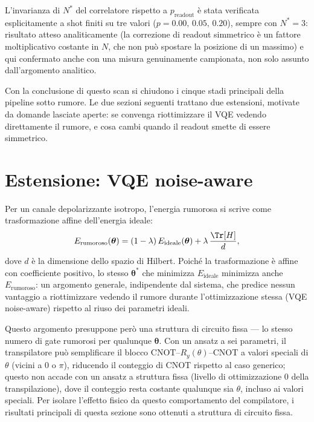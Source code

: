 \documentclass[11pt,a4paper]{article}
\begin{document}
L'invarianza di $N^*$ del correlatore rispetto a $p_\text{readout}$ è
stata verificata esplicitamente a shot finiti su tre valori
($p=0.00,\,0.05,\,0.20$), sempre con $N^*=3$: risultato atteso
analiticamente (la correzione di readout simmetrico è un fattore
moltiplicativo costante in $N$, che non può spostare la posizione di un
massimo) e qui confermato anche con una misura genuinamente campionata,
non solo assunto dall'argomento analitico.

Con la conclusione di questo scan si chiudono i cinque stadi principali
della pipeline sotto rumore. Le due sezioni seguenti trattano due
estensioni, motivate da domande lasciate aperte: se convenga
riottimizzare il VQE vedendo direttamente il rumore, e cosa cambi quando
il readout smette di essere simmetrico.

\section{Estensione: VQE noise-aware}
\label{sec:noise-aware}

Per un canale depolarizzante isotropo, l'energia rumorosa si scrive come
trasformazione affine dell'energia ideale:
\begin{equation}
E_\text{rumoroso}(\boldsymbol\theta) = (1-\lambda)\,E_\text{ideale}(\boldsymbol\theta)
+ \lambda\,\frac{\Tr[H]}{d},
\end{equation}
dove $d$ è la dimensione dello spazio di Hilbert. Poiché la
trasformazione è affine con coefficiente positivo, lo stesso
$\boldsymbol\theta^*$ che minimizza $E_\text{ideale}$ minimizza anche
$E_\text{rumoroso}$: un argomento generale, indipendente dal sistema, che
predice nessun vantaggio a riottimizzare vedendo il rumore durante
l'ottimizzazione stessa (VQE noise-aware) rispetto al riuso dei parametri
ideali.

Questo argomento presuppone però una struttura di circuito fissa --- lo
stesso numero di gate rumorosi per qualunque $\boldsymbol\theta$. Con un
ansatz a sei parametri, il transpilatore può semplificare il blocco
CNOT--$R_y(\theta)$--CNOT a valori speciali di $\theta$ (vicini a $0$ o
$\pi$), riducendo il conteggio di CNOT rispetto al caso generico; questo
non accade con un ansatz a struttura fissa (livello di ottimizzazione 0
della transpilazione), dove il conteggio resta costante qualunque sia
$\theta$, incluso ai valori speciali. Per isolare l'effetto fisico da
questo comportamento del compilatore, i risultati principali di questa
sezione sono ottenuti a struttura di circuito fissa.
\end{document}
